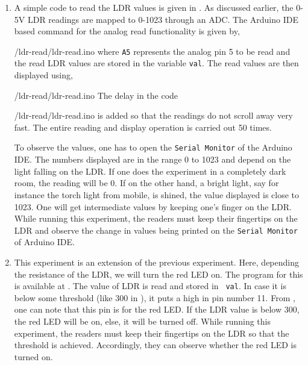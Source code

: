 \begin{enumerate}
  \item A simple code to read the LDR values is given in
        . As discussed earlier, the 0-5V LDR readings
        are mapped to 0-1023 through an ADC. The 
        Arduino IDE
        based command for the analog read functionality is given by,
        
        {\LocLDRardcode/ldr-read/ldr-read.ino} where {\tt A5} represents the
        analog pin 5 to be read and the read LDR values are stored in the
        variable {\tt val}.  The read values are then displayed using,
        
        {\LocLDRardcode/ldr-read/ldr-read.ino} The delay in the code  
        
        {\LocLDRardcode/ldr-read/ldr-read.ino} is added so that the readings
        do not scroll away very fast.  The entire reading and display
        operation is carried out 50 times. 
        
        To observe the values, one has to open the {\tt Serial Monitor} of
        the Arduino IDE.  The numbers displayed are in the range 0 to 1023
        and depend on the light falling on the LDR.  If one does the
        experiment in a completely dark room, the reading will be 0.  If on
        the other hand, a bright light, say for instance the torch light
        from mobile, is shined, the value displayed is close to 1023.  One
        will get intermediate values by keeping one's finger on the LDR. 
        While running this experiment, the readers must keep their fingertips on the LDR and
        observe the change in values being printed on the
          {\tt Serial Monitor} of Arduino IDE.
        
  \item This experiment is an extension of the previous
        experiment. Here, depending the resistance of the LDR, we will
        turn the red LED on.  The program for this is available at
        .  The value of LDR is read and stored in {\tt
            val}.  In case it is below some threshold (like 300 in ), 
        it puts a high in pin number 11.  From , 
        one can note that this pin is for the red LED.  If the LDR value is below 300, 
        the red LED will be on, else, it will be turned off.  While running this experiment, the readers 
        must keep their fingertips on the LDR so that the threshold is achieved. Accordingly, 
        they can observe whether the red LED is turned on. 
\end{enumerate}

